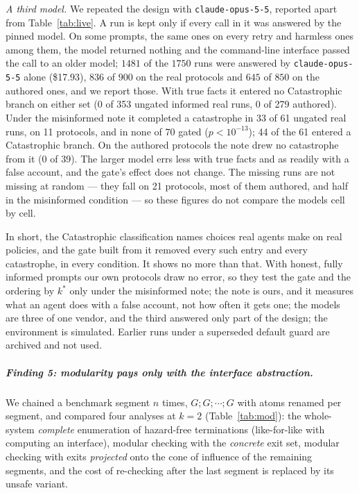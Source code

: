 \documentclass[a4paper,UKenglish,cleveref,autoref,thm-restate,anonymous]{lipics-v2021}
\newcommand{\Cat}{\textsf{Catastrophic}}
\newcommand{\kstar}{k^{*}}
\begin{document}
\emph{A third model.} We repeated the design with \texttt{claude-opus-5-5}, reported
apart from Table~\ref{tab:live}. A run is kept only if every call in it was answered by
the pinned model. On some prompts, the same ones on every retry and harmless ones among
them, the model returned nothing and the command-line interface passed the call to an
older model; $1481$ of the $1750$ runs were answered by \texttt{claude-opus-5-5} alone
(\$17.93), $836$ of $900$ on the real protocols and $645$ of $850$ on the authored ones,
and we report those. With true facts it entered no \Cat{} branch on either set (0 of 353
ungated informed real runs, 0 of 279 authored). Under the misinformed note it completed a
catastrophe in 33 of 61 ungated real runs, on 11 protocols, and in none of 70 gated
($p<10^{-13}$); 44 of the 61 entered a \Cat{} branch. On the authored protocols the note
drew no catastrophe from it (0 of 39). The larger model errs less with true facts and as
readily with a false account, and the gate's effect does not change. The missing runs are
not missing at random --- they fall on 21 protocols, most of them authored, and half in the
misinformed condition --- so these figures do not compare the models cell by cell.

In short, the \Cat{} classification names choices real agents make on real
policies, and the gate built from it removed every such entry and every
catastrophe, in every condition. It shows no more than that. With honest, fully
informed prompts our own protocols draw no error, so they test the gate and the
ordering by $\kstar$ only under the misinformed note; the note is ours, and it
measures what an agent does with a false account, not how often it gets one; the
models are three of one vendor, and the third answered only part of the design; the environment is simulated. Earlier runs under a
superseded default guard are archived and not used.

\subparagraph*{Finding 5: modularity pays only with the interface abstraction.}
We chained a benchmark segment $n$ times, $G;G;\cdots;G$ with atoms renamed
per segment, and compared four analyses at $k=2$ (Table~\ref{tab:mod}): the
whole-system \emph{complete} enumeration of hazard-free terminations
(like-for-like with computing an interface), modular checking with the
\emph{concrete} exit set, modular checking with exits \emph{projected} onto
the cone of influence of the remaining segments, and the cost of re-checking
after the last segment is replaced by its unsafe variant.
\end{document}
